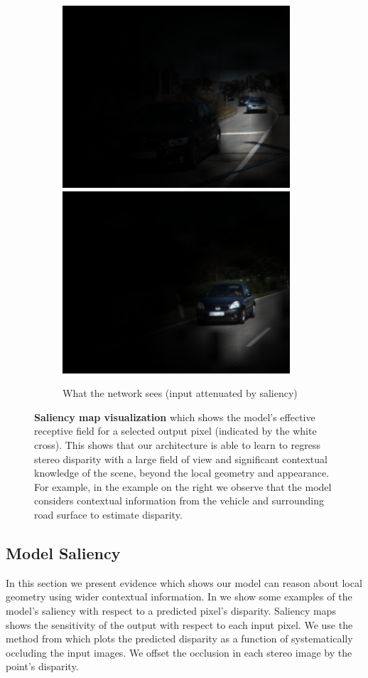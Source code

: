 \begin{figure}[p]
\begin{center}
\begin{subfigure}[t]{\linewidth}
            \includegraphics[width=0.32\linewidth,trim={0 0 0 1cm},clip]{saliency/000016_10_png_raw_frame_attenuated2.png}
            \includegraphics[width=0.32\linewidth,trim={0 0 0 1cm},clip]{saliency/000074_10_png_raw_frame_attenuated2.png}
	        \caption{What the network sees (input attenuated by saliency)}
		\end{subfigure}
	\end{center}
	\caption[Saliency map visualization.]{\textbf{Saliency map visualization} which shows the model's effective receptive field for a selected output pixel (indicated by the white cross). This shows that our architecture is able to learn to regress stereo disparity with a large field of view and significant contextual knowledge of the scene, beyond the local geometry and appearance. For example, in the example on the right we observe that the model considers contextual information from the vehicle and surrounding road surface to estimate disparity.}
	\label{fig:saliency_stereo}
\clearpage
\end{figure}

\subsection{Model Saliency}
\label{sec:saliency}

In this section we present evidence which shows our model can reason about local geometry using wider contextual information. In  we show some examples of the model's saliency with respect to a predicted pixel's disparity. Saliency maps \citep{simonyan2013deep} shows the sensitivity of the output with respect to each input pixel. We use the method from \citep{zeiler2014visualizing} which plots the predicted disparity as a function of systematically occluding the input images. We offset the occlusion in each stereo image by the point's disparity.

